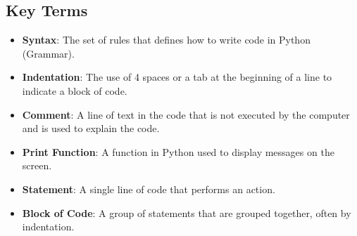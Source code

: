 \subsection*{Key Terms}
\begin{itemize}
    \item \textbf{Syntax}: The set of rules that defines how to write code in Python (Grammar).
    \item \textbf{Indentation}: The use of 4 spaces or a tab at the beginning of a line to indicate a block of code.
    \item \textbf{Comment}: A line of text in the code that is not executed by the computer and is used to explain the code.
    \item \textbf{Print Function}: A function in Python used to display messages on the screen.
    \item \textbf{Statement}: A single line of code that performs an action.
    \item \textbf{Block of Code}: A group of statements that are grouped together, often by indentation.
\end{itemize}